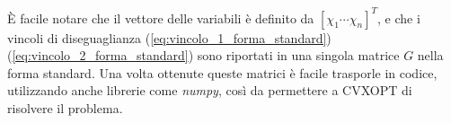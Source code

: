 \documentclass[a4paper,12pt]{report}
\begin{document}

\noindent \`E facile notare che il vettore delle variabili è definito da $[\chi_1 \cdots \chi_n]^{T}$, e che i vincoli di diseguaglianza (\ref{eq:vincolo_1_forma_standard}) (\ref{eq:vincolo_2_forma_standard}) sono riportati in una singola matrice $G$ nella forma standard. Una volta ottenute queste matrici è facile trasporle in codice, utilizzando anche librerie come \textit{numpy}, così da permettere a CVXOPT di risolvere il problema.
\end{document}
